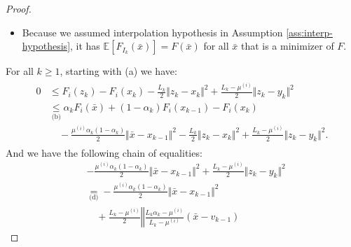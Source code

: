 \documentclass[12pt]{article}
\begin{document}
\begin{proof}
\begin{itemize}
\begin{align*}
{                        L_k\alpha_k - \mu^{(i)}
                    \right)^2}{2(L_k - \mu^{(i)})} 
                    -
                    \frac{\alpha_{k - 1}^2L_{k - 1}(1 - \alpha_k)}{2} 
                    = 
                    \frac{
                        \left(L_k \alpha_k - \mu^{(i)}\right)\mu^{(i)}
                        \left(\alpha_k - 1\right)
                    }
                    {2(L_k - \mu^{(i)})}
                    + \frac{\alpha_k(\mu - \mu^{(i)})}{2}. 
                \end{align*}
                \item[(h)] Because we assumed interpolation hypothesis in Assumption \ref{ass:interp-hypothesis}, it has $\mathbb E[F_{I_k}(\bar x)] = F(\bar x)$ for all $\bar x$ that is a minimizer of $F$. 
            \end{itemize}
            For all $k \ge 1$, starting with (a) we have: 
            \begin{align}\label{ineq:snapg2-one-step-chain1}
                \begin{split}
                    0 &\le F_i(z_k) - F_i(x_k) - \frac{L_k}{2}\Vert z_k - x_k\Vert^2 + \frac{L_k - \mu^{(i)}}{2}\Vert z_k - y_k\Vert^2
                    \\
                    &\underset{\text{(b)}}{\le}
                    \alpha_k F_i(\bar x) + (1 - \alpha_k)F_i(x_{k - 1}) - F_i(x_k) \\
                        &\quad 
                        - \frac{\mu^{(i)}\alpha_k(1 - \alpha_k)}{2}\Vert \bar x - x_{k - 1}\Vert^2
                        - \frac{L_k}{2}\Vert z_k - x_k\Vert^2 
                        + \frac{L_k - \mu^{(i)}}{2}\Vert z_k - y_k\Vert^2. 
                \end{split}
            \end{align}
            And we have the following chain of equalities:
            {\allowdisplaybreaks
            \begin{align*}
                & - \frac{\mu^{(i)}\alpha_k(1 - \alpha_k)}{2}\Vert \bar x - x_{k - 1}\Vert^2
                + \frac{L_k - \mu^{(i)}}{2}\Vert z_k - y_k\Vert^2
                \\
                &\underset{\text{(d)}}{=}
                - \frac{\mu^{(i)}\alpha_k(1 - \alpha_k)}{2}\Vert \bar x - x_{k - 1}\Vert^2 
                    \\&\quad
                    + \frac{L_k - \mu^{(i)}}{2}
                    \left\Vert
                        \frac{L_k\alpha_k - \mu^{(i)}}{L_k - \mu^{(i)}}(\bar x - v_{k - 1})

\end{align*}}
\end{proof}
\end{document}
